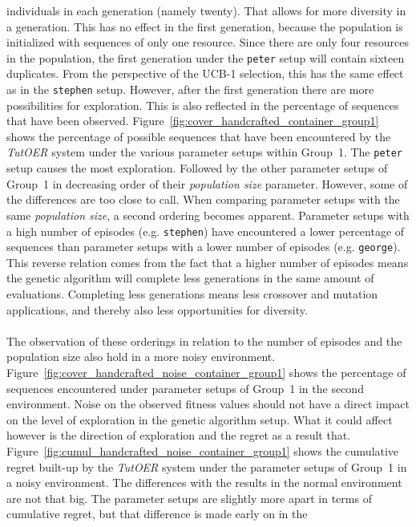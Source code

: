 individuals in each generation (namely twenty). That allows for more diversity in a
generation. This has no effect in the first generation, because the
population is initialized with sequences of only one resource. Since there are
only four resources in the population, the first generation under the
\texttt{peter} setup will contain sixteen duplicates. From the perspective of
the UCB-1 selection, this has the same effect as in the \texttt{stephen} setup.
However, after the first generation there are more possibilities for
exploration. This is also reflected in the percentage of sequences that have
been observed. Figure~\ref{fig:cover_handcrafted_container_group1}
shows the percentage of possible sequences that have been encountered by the
\emph{TutOER} system under the various parameter setups within Group~1. The
\texttt{peter} setup causes the most exploration. Followed by the other
parameter setups of Group~1 in decreasing order of their \emph{population size}
parameter. However, some of the differences are too close to call. When comparing
parameter setups with the same \emph{population size}, a second
ordering becomes apparent. Parameter setups with a
high number of episodes (e.g. \texttt{stephen}) have encountered a lower percentage of sequences than
parameter setups with a lower number of episodes (e.g. \texttt{george}). This
reverse relation comes from the fact that a higher number of episodes means
the genetic algorithm will complete less generations in the same amount of
evaluations. Completing less generations means less crossover and mutation
applications, and thereby also less opportunities for diversity.\\\\
\noindent
The observation of these orderings in relation to the number of episodes and
the population size also hold in a more noisy environment.
Figure~\ref{fig:cover_handcrafted_noise_container_group1} shows the
percentage of sequences encountered under parameter setups of Group~1 in the
second environment. Noise on the observed fitness values should not
have a direct impact on the level of exploration in the genetic algorithm
setup. What it could affect however is the direction of exploration and the
regret as a result that.
Figure~\ref{fig:cumul_handcrafted_noise_container_group1} shows the
cumulative regret built-up by the \emph{TutOER} system under the parameter
setups of Group~1 in a noisy environment. The differences with the results in
the normal environment are not that big. The parameter setups are slightly more apart in
terms of cumulative regret, but that difference is made early on in the
